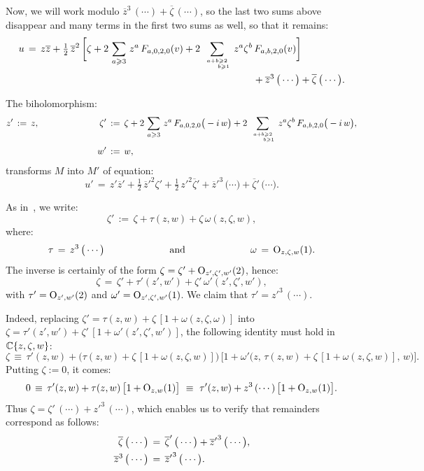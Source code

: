 \documentclass[12pt,twoside,leqno,openany]{amsart}
\begin{document}
Now, we will work modulo $\overline{z}^3\, (\cdots) + 
\overline{\zeta}\, (\cdots)$, so the last two sums above
disappear and many terms in the first
two sums as well, so that it remains:
\leqnomode{}
\begin{align}
\label{u-a-3-a-b-2}
u
&
\,=\,
z\overline{z}
+
\notag
\tfrac{1}{2}\,\overline{z}^2\,
\bigg[
\zeta
+
2\,\sum_{a\geqslant 3}\,
z^a\,F_{a,0,2,0}(v)
+
2\,\sum_{a+b\geqslant 2
\atop \ \ \ \ 
b\geqslant 1}\,
z^a\zeta^b\,
F_{a,b,2,0}(v)
\bigg]
\\
&
\ \ \ \ \ \ \ \ \ \ \ \ \ \ \ \ \ \ \ \ \ \ \ \ \ \ \ \ \ \ \ \ \ \ \
\ \ \ \ \ \ \ \ \ \ \ \ \ \ \ \ \ \ \ \ \ \ \ \ \ \ \ \ \ \ \ \ \ \ \
+
\overline{z}^3\,\big(\cdots\big)
+
\overline{\zeta}\,\big(\cdots\big).
\end{align}

\begin{Lemma}
The biholomorphism:
\[
\aligned
z'
\,:=\,
z,
\ \ \ \ \ \ \ \ \ \ \ \ \ \ \ \ \ \ \ \
\zeta'
&
\,:=\,
\zeta
+
2\,\sum_{a\geqslant 3}\,
z^a\,F_{a,0,2,0}\big(-i\,w\big)
+
2\,\sum_{a+b\geqslant 2
\atop\ \ \ \ 
b\geqslant 1}\,
z^a\zeta^b\,
F_{a,b,2,0}\big(-i\,w\big),
\\
w'
&
\,:=\,
w,
\endaligned
\]
transforms $M$ into $M'$ of equation:
\[
u
'\,=\,
z'\overline{z}'
+
\tfrac{1}{2}\,{\overline{z}'}^2\zeta'
+
\tfrac{1}{2}\,{z'}^2\overline{\zeta}'
+
{\overline{z}'}^3\,\big(\cdots\big)
+
\overline{\zeta}'\,\big(\cdots\big).
\]
\end{Lemma}

\proof
As in~{\cite{Foo-Merker-Ta-2019}}, we write:
\[
\zeta'
\,:=\,
\zeta
+
\tau(z,w)
+
\zeta\,\omega(z,\zeta,w),
\]
where:
\[
\tau
\,=\,
z^3\,\big(\cdots\big)
\ \ \ \ \ \ \ \ \ \ \ \ \ \ \ \ \ \ \ \
\text{and}
\ \ \ \ \ \ \ \ \ \ \ \ \ \ \ \ \ \ \ \
\omega
\,=\,
{\rm O}_{z,\zeta,w}(1).
\]
The inverse is certainly of the form
$\zeta = \zeta' + {\rm O}_{z', \zeta', w'}(2)$, hence:
\[
\zeta
\,=\,
\zeta'
+
\tau'(z',w')
+
\zeta'\,
\omega'(z',\zeta',w'),
\]
with $\tau' = {\rm O}_{z',w'}(2)$ and
$\omega' = {\rm O}_{z',\zeta',w'}(1)$. We claim that
$\tau' = {z'}^3\, (\cdots)$.

Indeed, replacing $\zeta' = \tau(z,w) + \zeta\, 
[1 + \omega(z, \zeta, \omega)]$ into 
$\zeta = \tau'(z', w') + \zeta'\, [1 + \omega'(z', 
\zeta', w')]$, the following identity must hold
in $\mathbb{C}\{ z, \zeta, w\}$:
\[
\zeta
\,\equiv\,
\tau'(z,w)
+
\big(
\tau(z,w)
+
\zeta\,[1+\omega(z,\zeta,w)]
\big)\,
\Big[
1
+
\omega'\big(
z,\,
\tau(z,w)
+
\zeta\,[1+\omega(z,\zeta,w)],\,
w
\big)
\Big].
\]
Putting $\zeta := 0$, it comes:
\[
0
\,\equiv\,
\tau'(z,w)
+
\tau(z,w)\,
\big[
1
+
{\rm O}_{z,w}(1)
\big]
\,\,\equiv\,\,
\tau'(z,w)
+
z^3\,(\cdots)\,
\big[
1
+
{\rm O}_{z,w}(1)
\big].
\]
Thus $\zeta = \zeta'\, (\cdots) + 
{z'}^3\, (\cdots)$, which enables us to verify that remainders 
correspond as follows:
\[
\aligned
\overline{\zeta}\,\big(\cdots\big)
&
\,=\,
\overline{\zeta}'\,\big(\cdots\big)
+
{\overline{z}'}^3\,
\big(\cdots\big),
\\
\overline{z}^3\,\big(\cdots\big)
&
\,=\,
{\overline{z}'}^3\,\big(\cdots\big).
\endaligned
\]
\end{document}
